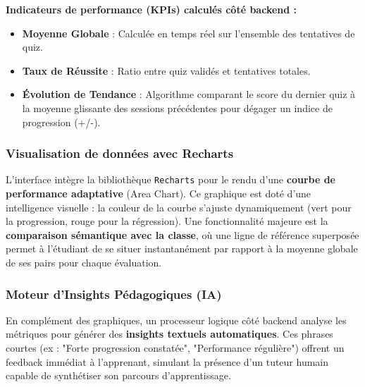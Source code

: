 \documentclass[12pt,a4paper]{report}
\begin{document}
\begin{scrumbox}
\textbf{Indicateurs de performance (KPIs) calculés côté backend :}
\begin{itemize}
  \item \textbf{Moyenne Globale} : Calculée en temps réel sur l'ensemble des tentatives de quiz.
  \item \textbf{Taux de Réussite} : Ratio entre quiz validés et tentatives totales.
  \item \textbf{Évolution de Tendance} : Algorithme comparant le score du dernier quiz à la moyenne glissante des sessions précédentes pour dégager un indice de progression (+/-).
\end{itemize}
\end{scrumbox}

\subsubsection{Visualisation de données avec Recharts}

L'interface intègre la bibliothèque \texttt{Recharts} pour le rendu d'une \textbf{courbe de performance adaptative} (Area Chart). Ce graphique est doté d'une intelligence visuelle : la couleur de la courbe s'ajuste dynamiquement (vert pour la progression, rouge pour la régression). Une fonctionnalité majeure est la \textbf{comparaison sémantique avec la classe}, où une ligne de référence superposée permet à l'étudiant de se situer instantanément par rapport à la moyenne globale de ses pairs pour chaque évaluation.

\subsubsection{Moteur d'Insights Pédagogiques (IA)}

En complément des graphiques, un processeur logique côté backend analyse les métriques pour générer des \textbf{insights textuels automatiques}. Ces phrases courtes (ex : "Forte progression constatée", "Performance régulière") offrent un feedback immédiat à l'apprenant, simulant la présence d'un tuteur humain capable de synthétiser son parcours d'apprentissage.
\end{document}
